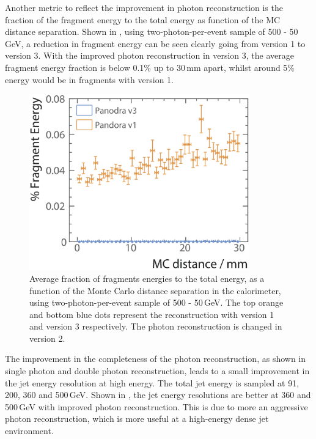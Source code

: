 Another metric to reflect the improvement in photon reconstruction is the fraction of the fragment energy to the total energy as function of the MC distance separation. Shown in , using two-photon-per-event sample of 500 - 50\,GeV, a reduction in fragment energy can be seen clearly going from \pandora version 1 to version 3. With the improved photon reconstruction in \pandora version 3, the average fragment energy fraction is below 0.1\% up to 30\,mm apart, whilst around 5\% energy would be in fragments with \pandora version 1.
\begin{figure}[tbph]
\centering
\includegraphics[width=0.85\textwidth]{photon/DoubleCompareFragEnergy2}
\caption[Average fraction fragments energies of the total energy, as a function of the MC distance separation]
{Average fraction of fragments energies to the total energy, as a function of the Monte Carlo distance separation in the calorimeter, using two-photon-per-event sample of 500 - 50\,GeV. The top orange and bottom blue dots represent the reconstruction with \pandora version 1 and version 3 respectively. The photon reconstruction is changed in \pandora version 2.}
\label{fig:photonDoubleFragEnergy}
\end{figure}




The improvement in the completeness of the photon reconstruction, as shown in single photon and double photon reconstruction, leads to a small improvement in the jet energy resolution at high energy. The total jet energy is sampled at 91, 200, 360 and 500\,GeV. Shown in , the jet energy resolutions are better at 360 and 500\,GeV with improved photon reconstruction. This is due to more an aggressive photon reconstruction, which is more useful at a high-energy dense jet environment.



